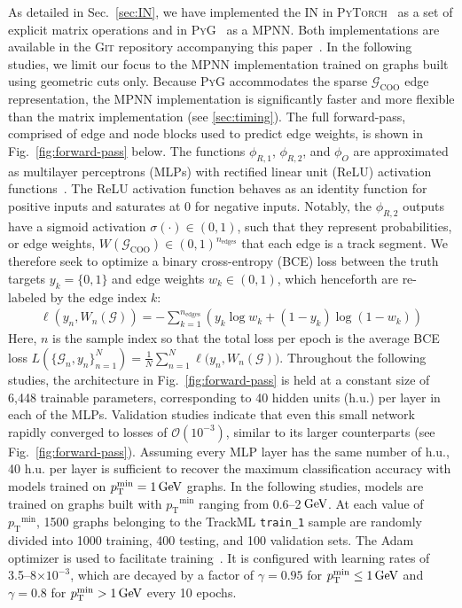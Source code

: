 \documentclass[twocolumn]{svjour3}
\newcommand{\pt}{\ensuremath{p_{\mathrm{T}}}\xspace}
\newcommand{\GeV}{\ensuremath{\,\text{Ge\hspace{-.08em}V}}\xspace}
\newcommand{\nedges}{\ensuremath{n_\mathrm{edges}\xspace}}
\begin{document}
As detailed in Sec.~\ref{sec:IN}, we have implemented the IN in \textsc{PyTorch}~\cite{pytorch} as a set of explicit matrix operations and in \textsc{PyG}~\cite{fey2019fast} as a MPNN. 
Both implementations are available in the \textsc{Git} repository accompanying this paper~\cite{IN_repo}. 
In the following studies, we limit our focus to the MPNN implementation trained on graphs built using geometric cuts only. 
Because \textsc{PyG} accommodates the sparse $\mathcal{G}_\mathrm{COO}$ edge representation, the MPNN implementation is significantly faster and more flexible than the matrix implementation (see \ref{sec:timing}). 
The full forward-pass, comprised of edge and node blocks used to predict edge weights, is shown in Fig.~\ref{fig:forward-pass} below. 
The functions $\phi_{R,1}$, $\phi_{R,2}$, and $\phi_O$ are approximated as multilayer perceptrons (MLPs) with rectified linear unit (ReLU) activation functions~\cite{relu1,relu2}. 
The ReLU activation function behaves as an identity function for positive inputs and saturates at 0 for negative inputs. 
Notably, the $\phi_{R,2}$ outputs have a sigmoid activation $\sigma(\cdot)\in(0,1)$, such that they represent probabilities, or edge weights,  $W(\mathcal{G}_\mathrm{COO})\in(0,1)^{\nedges}$ that each edge is a track segment. 
We therefore seek to optimize a binary cross-entropy (BCE) loss between the truth targets $y_k=\{0,1\}$ and edge weights $w_k\in(0,1)$, which henceforth are re-labeled by the edge index $k$:
\begin{align}
    \ell\left(y_n, W_n(\mathcal{G})\right) = -\sum_{k=1}^{\nedges}\left( y_k\log w_k + (1-y_k)\log (1-w_k)\right)
\end{align}
Here, $n$ is the sample index so that the total loss per epoch is the average BCE loss $L(\{\mathcal{G}_n, y_n\}_{n=1}^N)=\frac{1}{N}\sum_{n=1}^N \ell\big(y_n, W_n(\mathcal{G})\big)$. 
Throughout the following studies, the architecture in Fig.~\ref{fig:forward-pass} is held at a constant size of 6,448 trainable parameters, corresponding to 40 hidden units (h.u.) per layer in each of the MLPs.
Validation studies indicate that even this small network rapidly converged to losses of $\mathcal{O}(10^{-3})$, similar to its larger counterparts (see Fig.~\ref{fig:forward-pass}). 
Assuming every MLP layer has the same number of h.u., 40 h.u. per layer is sufficient to recover the maximum classification accuracy with models trained on $\pt^\mathrm{min}=1\GeV$ graphs.
In the following studies, models are trained on graphs built with $\pt^\mathrm{min}$ ranging from 0.6--2\GeV. 
At each value of $\pt^\mathrm{min}$, 1500 graphs belonging to the TrackML \texttt{train\_1} sample are randomly divided into 1000 training, 400 testing, and 100 validation sets. 
The Adam optimizer is used to facilitate training~\cite{adam}. 
It is configured with learning rates of 3.5--8$\times10^{-3}$, which are decayed by a factor of $\gamma=0.95$ for $\pt^\mathrm{min}\leq 1\GeV$ and $\gamma=0.8$ for $\pt^\mathrm{min}> 1\GeV$ every 10 epochs.
\end{document}
